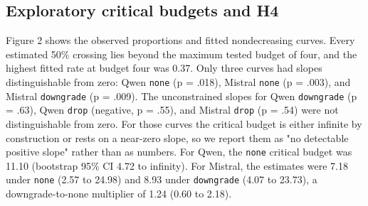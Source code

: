 \documentclass[11pt]{article}
\begin{document}
\begin{table}[htbp]
\centering
\caption{Post-review robustness analyses}
\scriptsize
{}
\end{table}
\FloatBarrier

\subsection{Exploratory critical budgets and H4}

Figure 2 shows the observed proportions and fitted nondecreasing curves. Every estimated 50\% crossing lies beyond the maximum tested budget of four, and the highest fitted rate at budget four was 0.37. Only three curves had slopes distinguishable from zero: Qwen \texttt{none} (p = .018), Mistral \texttt{none} (p = .003), and Mistral \texttt{downgrade} (p = .009). The unconstrained slopes for Qwen \texttt{downgrade} (p = .63), Qwen \texttt{drop} (negative, p = .55), and Mistral \texttt{drop} (p = .54) were not distinguishable from zero. For those curves the critical budget is either infinite by construction or rests on a near-zero slope, so we report them as "no detectable positive slope" rather than as numbers. For Qwen, the \texttt{none} critical budget was 11.10 (bootstrap 95\% CI 4.72 to infinity). For Mistral, the estimates were 7.18 under \texttt{none} (2.57 to 24.98) and 8.93 under \texttt{downgrade} (4.07 to 23.73), a downgrade-to-none multiplier of 1.24 (0.60 to 2.18).
\end{document}
